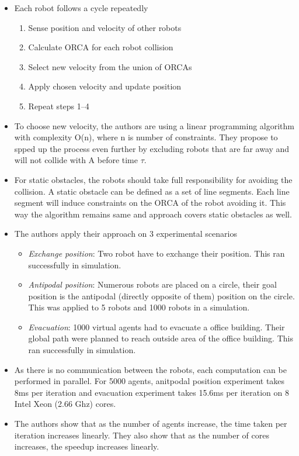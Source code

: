\documentclass[12pt]{article}
\begin{document}
\begin{itemize}
    \item Each robot follows a cycle repeatedly
        \begin{enumerate}
            \item Sense position and velocity of other robots
            \item Calculate ORCA for each robot collision
            \item Select new velocity from the union of ORCAs
            \item Apply chosen velocity and update position
            \item Repeat steps 1--4
        \end{enumerate}
    \item To choose new velocity, the authors are using a linear programming algorithm with complexity O(n), where n is number of constraints. They propose to spped up the process even further by excluding robots that are far away and will not collide with A before time $\tau$.
    \item For static obstacles, the robots should take full responsibility for avoiding the collision. A static obstacle can be defined as a set of line segments. Each line segment will induce constraints on the ORCA of the robot avoiding it. This way the algorithm remains same and approach covers static obstacles as well.
    \item The authors apply their approach on 3 experimental scenarios
        \begin{itemize}
            \item \textit{Exchange position}: Two robot have to exchange their position. This ran successfully in simulation.
            \item \textit{Antipodal position}: Numerous robots are placed on a circle, their goal position is the antipodal (directly opposite of them) position on the circle. This was applied to 5 robots and 1000 robots in a simulation.
            \item \textit{Evacuation}: 1000 virtual agents had to evacuate a office building. Their global path were planned to reach outside area of the office building. This ran successfully in simulation.
        \end{itemize}
    \item As there is no communication between the robots, each computation can be performed in parallel. For 5000 agents, anitpodal position experiment takes 8ms per iteration and evacuation experiment takes 15.6ms per iteration on 8 Intel Xeon (2.66 Ghz) cores. 
    \item The authors show that as the number of agents increase, the time taken per iteration increases linearly. They also show that as the number of cores increases, the speedup increases linearly.
\end{itemize}
\end{document}
